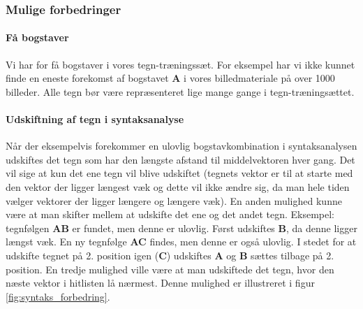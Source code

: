 \subsubsection{Mulige forbedringer}

\paragraph{Få bogstaver}
Vi har for få bogstaver i vores tegn-træningssæt. For eksempel har vi ikke kunnet finde en eneste forekomst af bogstavet \textbf{A} i vores billedmateriale på over 1000 billeder. Alle tegn bør være repræsenteret lige mange gange i tegn-træningsættet.

\paragraph{Udskiftning af tegn i syntaksanalyse}
Når der eksempelvis forekommer en ulovlig bogstavkombination i syntaksanalysen udskiftes det tegn som har den længste afstand til middelvektoren hver gang. Det vil sige at kun det ene tegn vil blive udskiftet (tegnets vektor er til at starte med den vektor der ligger længest væk og dette vil ikke ændre sig, da man hele tiden vælger vektorer der ligger længere og længere væk). En anden mulighed kunne være at man skifter mellem at udskifte det ene og det andet tegn. Eksempel: tegnfølgen \textbf{AB} er fundet, men denne er ulovlig. Først udskiftes \textbf{B}, da denne ligger længst væk. En ny tegnfølge \textbf{AC} findes, men denne er også ulovlig. I stedet for at udskifte tegnet på 2. position igen (\textbf{C}) udskiftes \textbf{A} og \textbf{B} sættes tilbage på 2. position. En tredje mulighed ville være at man udskiftede det tegn, hvor den næste vektor i hitlisten lå nærmest. Denne mulighed er illustreret i figur \vref{fig:syntaks_forbedring}.


